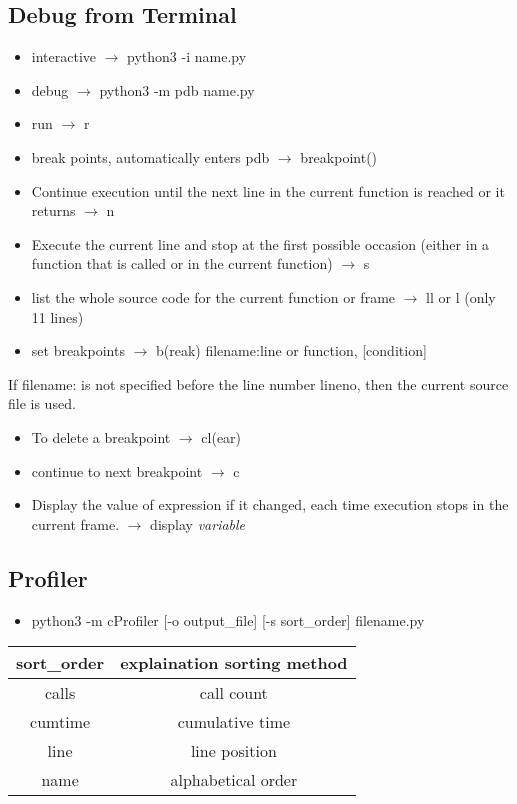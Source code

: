 \documentclass{article}
\begin{document}
\begin{multicols}{2}
\section{Debug from Terminal}

\begin{itemize}
\item interactive $\rightarrow$ python3 -i name.py
\item debug $\rightarrow$ python3 -m pdb name.py \cite{pdb}
\item run $\rightarrow$ r
\item break points, automatically enters pdb $\rightarrow$  breakpoint()
\item Continue execution until the next line in the current function is reached or it returns $\rightarrow$ n
\item Execute the current line and stop at the first possible occasion (either in a function that is called or in the current function)  $\rightarrow$ s
\item list the whole source code for the current function or frame $\rightarrow$ ll  or l (only 11 lines)
\item set breakpoints $\rightarrow$ b(reak) filename:line or function, [condition]
\end{itemize}
If filename: is not specified before the line number lineno, then the current source file is used.
\begin{itemize}
\item To delete a breakpoint $\rightarrow$ cl(ear)
\item continue to next breakpoint $\rightarrow$ c
\item Display the value of expression if it changed, each time execution stops in the current frame. $\rightarrow$  display \textit{variable}
\end{itemize}
\subsection{Profiler}
\begin{itemize}
\item python3 -m cProfiler [-o output\_file] [-s sort\_order] filename.py
\end{itemize}
\begin{center}
\begin{tabular}{ |c |c |}
\hline
sort\_order & explaination sorting method \\ \hline \hline
 calls & call count \\ \hline
 cumtime & cumulative time \\  \hline
 line & line position \\ \hline
 name & alphabetical order \\ \hline   
\end{tabular}
\end{center}


\end{multicols}
\end{document}
